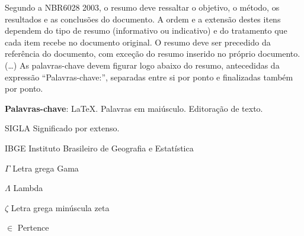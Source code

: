 \documentclass[
    12pt,				%
    a4paper,            %
    oneside,			%
    openright,			%
    ruledheader,
    anapcustomindent,
    sumario = tradicional,
    abntfigtabnum,
    tocpage=plain,
    english,			%
	brazil,				%
    ]{abntex-ifrn/abntex2-trabalho} %
\begin{document}

\frenchspacing 

\pretextual

\imprimircapa

\imprimirfolhaderosto

\setlength{\absparsep}{18pt} %
\begin{resumo}
 Segundo a NBR6028 2003, o resumo deve ressaltar o
 objetivo, o método, os resultados e as conclusões do documento. A ordem e a extensão
 destes itens dependem do tipo de resumo (informativo ou indicativo) e do
 tratamento que cada item recebe no documento original. O resumo deve ser
 precedido da referência do documento, com exceção do resumo inserido no
 próprio documento. (\ldots) As palavras-chave devem figurar logo abaixo do
 resumo, antecedidas da expressão ``Palavras-chave:'', separadas entre si por
 ponto e finalizadas também por ponto. 

 \textbf{Palavras-chave}: \LaTeX. Palavras em maiúsculo. Editoração de texto.
\end{resumo}

\listoffigures*
\cleardoublepage

\listoftables*
\cleardoublepage

\begin{siglas}
  \item [SIGLA] Significado por extenso. 
  \item [IBGE] Instituto Brasileiro de Geografia e Estatística
\end{siglas}

\begin{simbolos}
  \item[$ \Gamma $] Letra grega Gama
  \item[$ \Lambda $] Lambda
  \item[$ \zeta $] Letra grega minúscula zeta
  \item[$ \in $] Pertence
\end{simbolos}
\end{document}
